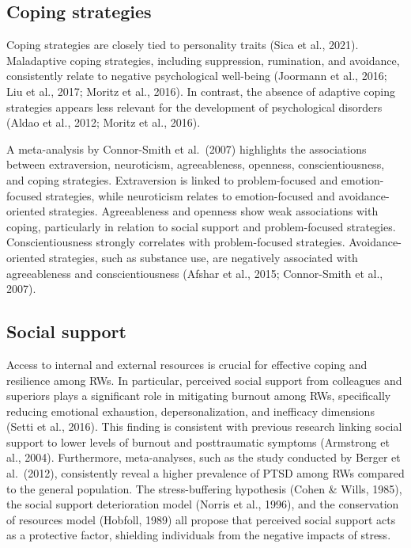 \documentclass[
  man]{apa6}
\begin{document}
\hypertarget{coping-strategies}{%
\subsection{Coping strategies}\label{coping-strategies}}

Coping strategies are closely tied to personality traits (Sica et al., 2021). Maladaptive coping strategies, including suppression, rumination, and avoidance, consistently relate to negative psychological well-being (Joormann et al., 2016; Liu et al., 2017; Moritz et al., 2016). In contrast, the absence of adaptive coping strategies appears less relevant for the development of psychological disorders (Aldao et al., 2012; Moritz et al., 2016).

A meta-analysis by Connor-Smith et al.~(2007) highlights the associations between extraversion, neuroticism, agreeableness, openness, conscientiousness, and coping strategies. Extraversion is linked to problem-focused and emotion-focused strategies, while neuroticism relates to emotion-focused and avoidance-oriented strategies. Agreeableness and openness show weak associations with coping, particularly in relation to social support and problem-focused strategies. Conscientiousness strongly correlates with problem-focused strategies. Avoidance-oriented strategies, such as substance use, are negatively associated with agreeableness and conscientiousness (Afshar et al., 2015; Connor-Smith et al., 2007).

\hypertarget{social-support}{%
\subsection{Social support}\label{social-support}}

Access to internal and external resources is crucial for effective coping and resilience among RWs. In particular, perceived social support from colleagues and superiors plays a significant role in mitigating burnout among RWs, specifically reducing emotional exhaustion, depersonalization, and inefficacy dimensions (Setti et al., 2016). This finding is consistent with previous research linking social support to lower levels of burnout and posttraumatic symptoms (Armstrong et al., 2004). Furthermore, meta-analyses, such as the study conducted by Berger et al.~(2012), consistently reveal a higher prevalence of PTSD among RWs compared to the general population. The stress-buffering hypothesis (Cohen \& Wills, 1985), the social support deterioration model (Norris et al., 1996), and the conservation of resources model (Hobfoll, 1989) all propose that perceived social support acts as a protective factor, shielding individuals from the negative impacts of stress.
\end{document}
